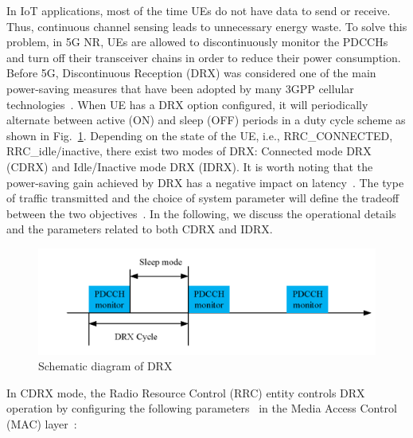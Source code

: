 \documentclass[]{IEEEtran}
\begin{document}
In IoT applications, most of the time UEs do not have data to send or receive. Thus, continuous channel sensing leads to unnecessary energy waste. 
To solve this problem, in 5G NR, UEs are allowed to discontinuously monitor the PDCCHs and turn off their transceiver chains in order to reduce their power consumption. 
Before 5G, Discontinuous Reception (DRX) was considered one of the main power-saving measures that have been adopted by many 3GPP cellular technologies~\cite{TS_36.321, TS_36.304}.
When UE has a DRX option configured, it will periodically alternate between active (ON) and sleep (OFF) periods in a duty cycle scheme as shown in Fig.~\ref{fig:5g-drx}. 
Depending on the state of the UE, i.e., RRC\_CONNECTED, RRC\_idle/inactive, there exist two modes of DRX: Connected mode DRX (CDRX) and Idle/Inactive mode DRX (IDRX).
It is worth noting that the power-saving gain achieved by DRX has a negative impact on latency~\cite{paris2022adaptive}.
The type of traffic transmitted and the choice of system parameter will define the tradeoff between the two objectives~\cite{koc2014device}.
In the following, we discuss the operational details and the parameters related to both CDRX and IDRX.
\begin{figure}
    \centering
    \includegraphics[width=\linewidth]{Pictures/Schematic diagram of DRX.png}
    \caption{Schematic diagram of DRX}
    \label{fig:5g-drx}
\end{figure}


    In CDRX mode, the Radio Resource Control (RRC) entity controls DRX operation by configuring the following parameters~\cite{3gpp_nr_nodate-3_38.331} in the Media Access Control (MAC) layer~\cite{TS_38.321}:
\end{document}
